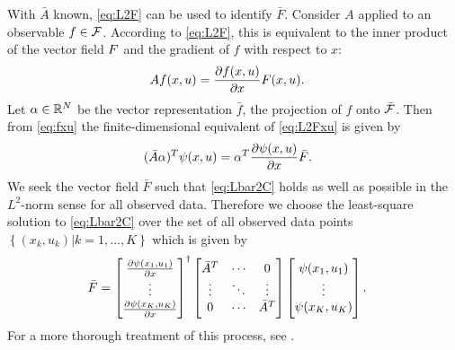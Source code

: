With $\bar{A}$ known, \eqref{eq:L2F} can be used to identify $\bar{F}$.
Consider $A$ applied to an observable $f \in \mathcal{F}$.
According to \eqref{eq:L2F}, this is equivalent to the inner product of the vector field $F$ and the gradient of ${f}$ with respect to $x$:
\begin{align}
    A f(x,u) &= \frac{\partial f(x,u)}{\partial x} F(x,u).
    \label{eq:L2Fxu}
\end{align}
Let $\alpha \in \mathbb{R}^N$ be the vector representation $\bar{f}$, the projection of ${f}$ onto $\bar{\mathcal{F}}$.
Then from \eqref{eq:fxu} the finite-dimensional equivalent of \eqref{eq:L2Fxu} is given by
\begin{align}
    (\bar{A} {\alpha})^T {\psi}(x,u) &= {\alpha}^T \frac{\partial \psi(x, u)}{\partial x} \bar{F}.
    \label{eq:Lbar2C}
\end{align}
We seek the vector field $\bar{F}$ such that \eqref{eq:Lbar2C} holds as well as possible in the $L^2$-norm sense for all observed data.
Therefore we choose the least-square solution to \eqref{eq:Lbar2C} over the set of all observed data points $\left\{ (x_k,u_k) | k = 1,...,K \right\}$ which is given by
\begin{align}
    \bar{F} &= \begin{bmatrix}  \frac{\partial \psi(x_1, u_1)}{\partial x} \\ \vdots \\ \frac{\partial \psi(x_K, u_K)}{\partial x}  \end{bmatrix}^\dagger
    \begin{bmatrix}  \bar{A}^T & \cdots & 0 \\ \vdots & \ddots & \vdots \\ 0 & \cdots & \bar{A}^T  \end{bmatrix}
    \begin{bmatrix}  \psi(x_1,u_1) \\ \vdots \\ \psi(x_K,u_K)  \end{bmatrix}.
    \label{eq:Fbar}
\end{align}
For a more thorough treatment of this process, see \cite{mauroy2016linear, mauroy2017koopman}.